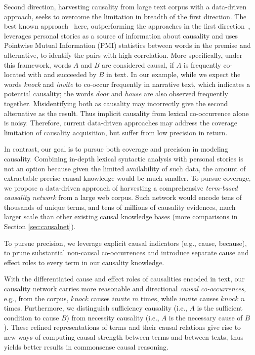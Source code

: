 \documentclass[letterpaper]{article}
\newcommand{\secref}[1]{Section \ref{#1}}
\begin{document}
Second direction, harvesting causality from large
text corpus with a data-driven approach, seeks to overcome
the limitation in breadth of the first direction.
The best known approach~\cite{gordon2011commonsense} here,
outperforming the approaches in the first direction~\cite{gordon2012copa},
leverages personal stories as a source of information about causality and uses
Pointwise Mutual Information (PMI) statistics \cite{church1990word}
between words in the premise and alternative, to identify the pairs with
high correlation. More specifically, under this framework,
words $A$ and $B$ are considered causal, if $A$ is frequently co-located
with and succeeded by $B$ in text.
In our example, while we expect the words \emph{knock} and \emph{invite}
to co-occur frequently in narrative text, which indicates a potential causality;
the words \emph{door} and \emph{house} are also observed frequently together.
Misidentifying both as causality may incorrectly give the second
alternative as the result.
Thus implicit causality from lexical co-occurrence alone is noisy.
Therefore, current data-driven approaches may address the coverage
limitation of causality acquisition, but suffer from low precision in return.

In contrast, our goal is to pursue both coverage and precision
in modeling causality. Combining in-depth lexical syntactic analysis with
personal stories is not an option because given the limited availability
of such data,
the amount of extractable precise causal knowledge would be much smaller.
To pursue coverage, we propose a data-driven approach of harvesting
a comprehensive \emph{term-based causality network} from a large web corpus.
Such network would encode tens of thousands of unique terms,
and tens of millions of causality evidences, much larger scale than other
existing causal knowledge bases (more comparisons in \secref{sec:causalnet}).

To pursue precision, we leverage explicit causal indicators
(e.g., cause, because), to prune substantial non-causal co-occurrences and
introduce separate cause and effect roles to every term in our
causality knowledge.

With the differentiated cause and effect roles of causalities encoded in text,
our causality network carries more reasonable and
directional {\em causal co-occurrences}, e.g., from the corpus,
$knock$ causes $invite$ $m$ times, while $invite$ causes
$knock$ $n$ times. Furthermore, we distinguish sufficiency causality (i.e.,
$A$ is the sufficient condition to cause $B$) from necessity causality
(i.e., $A$ is the necessary cause of $B$).
These refined representations of terms and their causal relations
give rise to new ways of computing causal strength between
terms and between texts,
thus yields better results in commonsense causal reasoning.
\end{document}
